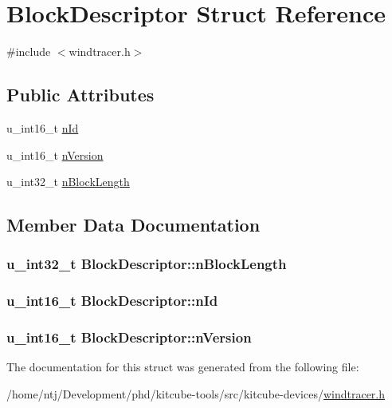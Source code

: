 \hypertarget{structBlockDescriptor}{\section{Block\-Descriptor Struct Reference}
\label{structBlockDescriptor}
}


{\ttfamily \#include $<$windtracer.\-h$>$}

\subsection*{Public Attributes}
\begin{DoxyCompactItemize}
\item 
u\-\_\-int16\-\_\-t \hyperlink{structBlockDescriptor_aa3846231510e5b10f0d51e64562d40a4}{n\-Id}
\item 
u\-\_\-int16\-\_\-t \hyperlink{structBlockDescriptor_a5858ecb423e25232155c9ba8ad1a2e88}{n\-Version}
\item 
u\-\_\-int32\-\_\-t \hyperlink{structBlockDescriptor_a793970f05388409895dcbdbd54bc4bfd}{n\-Block\-Length}
\end{DoxyCompactItemize}


\subsection{Member Data Documentation}
\hypertarget{structBlockDescriptor_a793970f05388409895dcbdbd54bc4bfd}{
\subsubsection[{n\-Block\-Length}]{\setlength{\rightskip}{0pt plus 5cm}u\-\_\-int32\-\_\-t Block\-Descriptor\-::n\-Block\-Length}}\label{structBlockDescriptor_a793970f05388409895dcbdbd54bc4bfd}
\hypertarget{structBlockDescriptor_aa3846231510e5b10f0d51e64562d40a4}{
\subsubsection[{n\-Id}]{\setlength{\rightskip}{0pt plus 5cm}u\-\_\-int16\-\_\-t Block\-Descriptor\-::n\-Id}}\label{structBlockDescriptor_aa3846231510e5b10f0d51e64562d40a4}
\hypertarget{structBlockDescriptor_a5858ecb423e25232155c9ba8ad1a2e88}{
\subsubsection[{n\-Version}]{\setlength{\rightskip}{0pt plus 5cm}u\-\_\-int16\-\_\-t Block\-Descriptor\-::n\-Version}}\label{structBlockDescriptor_a5858ecb423e25232155c9ba8ad1a2e88}


The documentation for this struct was generated from the following file\-:\begin{DoxyCompactItemize}
\item 
/home/ntj/\-Development/phd/kitcube-\/tools/src/kitcube-\/devices/\hyperlink{windtracer_8h}{windtracer.\-h}\end{DoxyCompactItemize}
